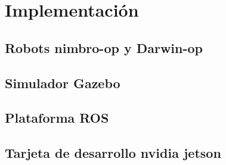 \chapter{Implementación}
\section{Robots nimbro-op y Darwin-op}
\section{Simulador Gazebo}
\section{Plataforma ROS}
\section{Tarjeta de desarrollo nvidia jetson}
